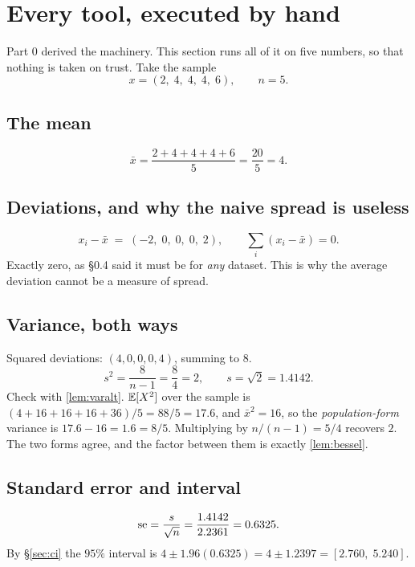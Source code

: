 \section{Every tool, executed by hand}
\label{sec:worked}

Part 0 derived the machinery. This section runs all of it on five numbers, so
that nothing is taken on trust. Take the sample
\[
x = (2,\;4,\;4,\;4,\;6),\qquad n=5 .
\]

\subsection{The mean}
\[
\bar x=\frac{2+4+4+4+6}{5}=\frac{20}{5}=4 .
\]

\subsection{Deviations, and why the naive spread is useless}
\[
x_i-\bar x \;=\; (-2,\;0,\;0,\;0,\;2),\qquad \sum_i (x_i-\bar x) = 0 .
\]
Exactly zero, as §0.4 said it must be for \emph{any} dataset. This is why the
average deviation cannot be a measure of spread.

\subsection{Variance, both ways}
Squared deviations: $(4,0,0,0,4)$, summing to $8$.
\[
s^2=\frac{8}{n-1}=\frac{8}{4}=2,\qquad s=\sqrt{2}=1.4142 .
\]
Check with \cref{lem:varalt}. $\mathbb{E}[X^2]$ over the sample is
$(4+16+16+16+36)/5 = 88/5 = 17.6$, and $\bar x^2 = 16$, so the
\emph{population-form} variance is $17.6-16=1.6 = 8/5$. Multiplying by
$n/(n-1)=5/4$ recovers $2$. The two forms agree, and the factor between them is
exactly \cref{lem:bessel}.

\subsection{Standard error and interval}
\[
\operatorname{se}=\frac{s}{\sqrt n}=\frac{1.4142}{2.2361}=0.6325 .
\]
By §\ref{sec:ci} the $95\%$ interval is
$4 \pm 1.96(0.6325) = 4 \pm 1.2397 = [2.760,\;5.240]$.

